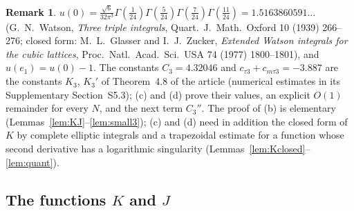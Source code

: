 \documentclass[11pt,a4paper]{article}
\theoremstyle{plain}
\theoremstyle{definition}
\newtheorem{remark}[theorem]{Remark}
\numberwithin{equation}{section}
\begin{document}
\begin{remark}
$u(0)=\frac{\sqrt6}{32\pi^3}\Gamma(\frac1{24})\Gamma(\frac5{24})\Gamma(\frac7{24})\Gamma(\frac{11}{24})=1.5163860591\ldots$ (G.~N.~Watson, \emph{Three triple integrals}, Quart.\ J.\ Math.\ Oxford 10 (1939) 266--276; closed form: M.~L.~Glasser and I.~J.~Zucker, \emph{Extended Watson integrals for the cubic lattices}, Proc.\ Natl.\ Acad.\ Sci.\ USA 74 (1977) 1800--1801), and $u(e_1)=u(0)-1$. The constants $C_3=4.32046$ and $c_{\tau3}+c_{m\tau3}=-3.887$ are the constants $K_3$, $K_3'$ of Theorem~4.8 of the article (numerical estimates in its Supplementary Section~S5.3); (c) and (d) prove their values, an explicit $O(1)$ remainder for every $N$, and the next term $C_3''$. The proof of (b) is elementary (Lemmas~\ref{lem:KJ}--\ref{lem:small3}); (c) and (d) need in addition the closed form of $K$ by complete elliptic integrals and a trapezoidal estimate for a function whose second derivative has a logarithmic singularity (Lemmas~\ref{lem:Kclosed}--\ref{lem:quant}).
\end{remark}

\subsection{The functions $K$ and $J$}
\end{document}
